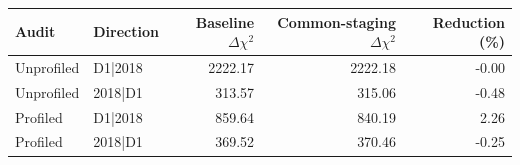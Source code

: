 \begin{tabular}{l l r r r}
\toprule
Audit & Direction & Baseline $\Delta\chi^2$ & Common-staging $\Delta\chi^2$ & Reduction (\%) \\
\midrule
Unprofiled & D1|2018 & 2222.17 & 2222.18 & -0.00 \\
Unprofiled & 2018|D1 & 313.57 & 315.06 & -0.48 \\
Profiled & D1|2018 & 859.64 & 840.19 & 2.26 \\
Profiled & 2018|D1 & 369.52 & 370.46 & -0.25 \\
\bottomrule
\end{tabular}
